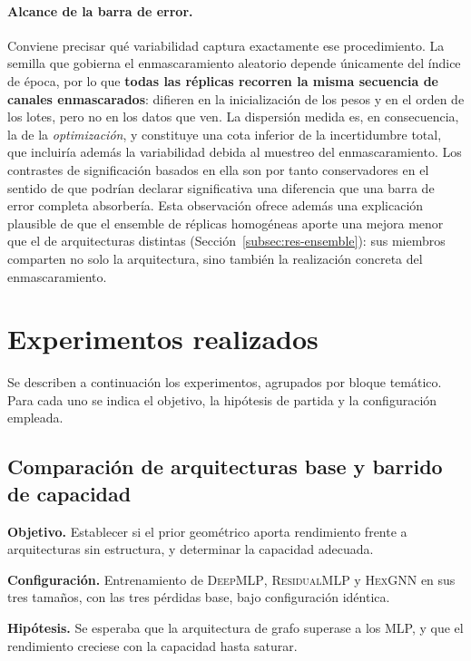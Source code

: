 \paragraph{Alcance de la barra de error.} Conviene precisar qué variabilidad captura exactamente ese
procedimiento. La semilla que gobierna el enmascaramiento aleatorio depende únicamente del índice de
época, por lo que \textbf{todas las réplicas recorren la misma secuencia de canales enmascarados}:
difieren en la inicialización de los pesos y en el orden de los lotes, pero no en los datos que ven.
La dispersión medida es, en consecuencia, la de la \emph{optimización}, y constituye una cota
inferior de la incertidumbre total, que incluiría además la variabilidad debida al muestreo del
enmascaramiento. Los contrastes de significación basados en ella son por tanto conservadores en el
sentido de que podrían declarar significativa una diferencia que una barra de error completa
absorbería. Esta observación ofrece además una explicación plausible de que el ensemble de réplicas
homogéneas aporte una mejora menor que el de arquitecturas distintas
(Sección~\ref{subsec:res-ensemble}): sus miembros comparten no solo la arquitectura, sino también la
realización concreta del enmascaramiento.


\section{Experimentos realizados}
\label{sec:experimentos}

Se describen a continuación los experimentos, agrupados por bloque temático. Para cada uno se
indica el objetivo, la hipótesis de partida y la configuración empleada.

\subsection{Comparación de arquitecturas base y barrido de capacidad}
\label{subsec:exp-arquitecturas}

\textbf{Objetivo.} Establecer si el prior geométrico aporta rendimiento frente a arquitecturas sin
estructura, y determinar la capacidad adecuada.

\textbf{Configuración.} Entrenamiento de \textsc{DeepMLP}, \textsc{ResidualMLP} y \textsc{HexGNN} en
sus tres tamaños, con las tres pérdidas base, bajo configuración idéntica.

\textbf{Hipótesis.} Se esperaba que la arquitectura de grafo superase a los MLP, y que el
rendimiento creciese con la capacidad hasta saturar.

